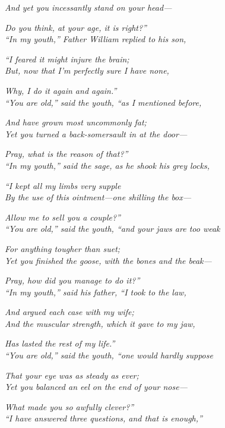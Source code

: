 \documentclass[book, 20pt]{extbook}
\begin{document}
\noindent\emph{And yet you incessantly stand on your head---}

\emph{Do you think, at your age, it is right?''\\}
\bigskip
\noindent\emph{``In my youth,'' Father William replied to his son,}

\emph{``I feared it might injure the brain;\\}
\noindent\emph{But, now that I'm perfectly sure I have none,}

\emph{Why, I do it again and again.''\\}
\bigskip
\noindent\emph{``You are old,'' said the youth, ``as I mentioned before,}

\emph{And have grown most uncommonly fat;\\}
\noindent\emph{Yet you turned a back-somersault in at the door---}

\emph{Pray, what is the reason of that?''\\}
\bigskip
\noindent\emph{``In my youth,'' said the sage, as he shook his grey locks,}

\emph{``I kept all my limbs very supple\\}
\noindent\emph{By the use of this ointment---one shilling the box---}

\emph{Allow me to sell you a couple?''\\}
\bigskip
\noindent\emph{``You are old,'' said the youth, ``and your jaws are too weak}

\emph{For anything tougher than suet;\\}
\noindent\emph{Yet you finished the goose, with the bones and the beak---}

\emph{Pray, how did you manage to do it?''\\}
\bigskip
\noindent\emph{``In my youth,'' said his father, ``I took to the law,}

\emph{And argued each case with my wife;\\}
\noindent\emph{And the muscular strength, which it gave to my jaw,}

\emph{Has lasted the rest of my life.''\\}
\newpage
\noindent\emph{``You are old,'' said the youth, ``one would hardly suppose}

\emph{That your eye was as steady as ever;\\}
\noindent\emph{Yet you balanced an eel on the end of your nose---}

\emph{What made you so awfully clever?''\\}
\bigskip
\noindent\emph{``I have answered three questions, and that is enough,''}
\end{document}
